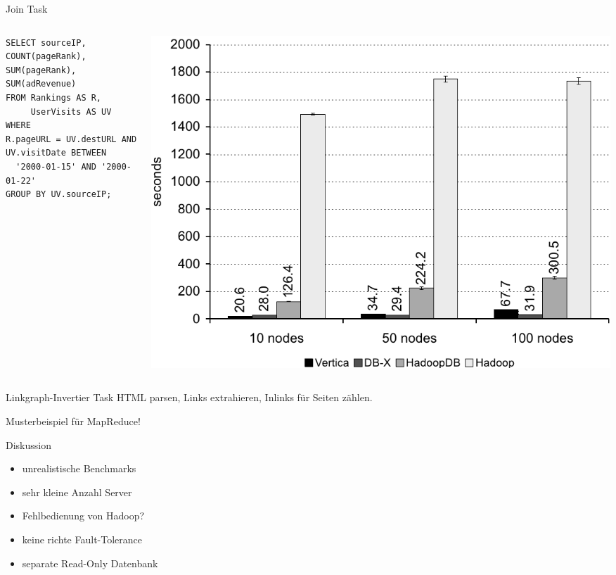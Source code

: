 \documentclass{beamer}
\begin{document}
\begin{frame}[fragile]{Join Task}
  \begin{columns}
    \begin{column}{0.6\textwidth}
\begin{verbatim}
SELECT sourceIP, COUNT(pageRank),
SUM(pageRank), SUM(adRevenue)
FROM Rankings AS R,
     UserVisits AS UV
WHERE
R.pageURL = UV.destURL AND
UV.visitDate BETWEEN
  '2000-01-15' AND '2000-01-22'
GROUP BY UV.sourceIP;
\end{verbatim} 
    \end{column}
    \begin{column}{0.4\textwidth}
      \includegraphics[width=\textwidth]{../ausarbeitung/images/diagram_join_task.png}
    \end{column}
  \end{columns}
\end{frame}

\begin{frame}{Linkgraph-Invertier Task}
  HTML parsen, Links extrahieren, Inlinks für Seiten zählen.
  
  Musterbeispiel für MapReduce!
\end{frame}

\begin{frame}{Diskussion}
  \begin{itemize}
  \item unrealistische Benchmarks
  \item sehr kleine Anzahl Server
  \item Fehlbedienung von Hadoop?
  \item keine richte Fault-Tolerance
  \item separate Read-Only Datenbank
  \end{itemize}
\end{frame}
\end{document}
